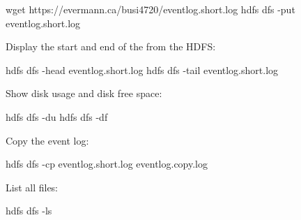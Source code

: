 \begin{samepage}
\begin{bashcode}
wget https://evermann.ca/busi4720/eventlog.short.log
hdfs dfs -put eventlog.short.log
\end{bashcode}
\end{samepage}

Display the start and end of the from the HDFS:
\begin{samepage}
\begin{bashcode}
hdfs dfs -head eventlog.short.log
hdfs dfs -tail eventlog.short.log
\end{bashcode}
\end{samepage}

Show disk usage and disk free space:
\begin{samepage}
\begin{bashcode}
hdfs dfs -du
hdfs dfs -df
\end{bashcode}
\end{samepage}

Copy the event log:
\begin{bashcode}
hdfs dfs -cp eventlog.short.log eventlog.copy.log
\end{bashcode}

List all files:
\begin{bashcode}
hdfs dfs -ls
\end{bashcode}


